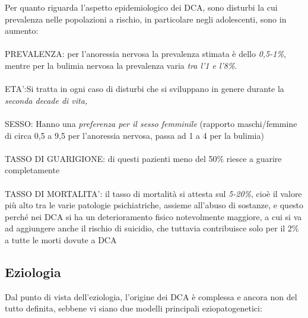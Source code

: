 Per quanto riguarda l'aspetto epidemiologico dei DCA, sono disturbi la
cui prevalenza nelle popolazioni a rischio, in particolare negli
adolescenti, sono in aumento:
\\\\
PREVALENZA: per l'anoressia nervosa la prevalenza stimata è dello
\emph{0,5-1\%}, mentre per la bulimia nervosa la prevalenza varia
\emph{tra l'1 e l'8\%}.
\\\\
ETA':Si tratta in ogni caso di disturbi che si sviluppano in genere
durante la \emph{seconda decade di vita,}
\\\\
SESSO: Hanno una \emph{preferenza per il sesso femminile} (rapporto
maschi/femmine di circa 0,5 a 9,5 per l'anoressia nervosa, passa ad 1 a
4 per la bulimia)
\\\\
TASSO DI GUARIGIONE: di questi pazienti meno del 50\% riesce a guarire
completamente
\\\\
TASSO DI MORTALITA': il tasso di mortalità si attesta sul \emph{5-20\%},
cioè il valore più alto tra le varie patologie psichiatriche, assieme
all'abuso di sostanze, e questo perché nei DCA si ha un deterioramento
fisico notevolmente maggiore, a cui si va ad aggiungere anche il rischio
di suicidio, che tuttavia contribuisce solo per il 2\% a tutte le morti
dovute a DCA

\subsection{Eziologia}

Dal punto di vista dell'eziologia, l'origine dei DCA è complessa e
ancora non del tutto definita, sebbene vi siano due modelli principali
eziopatogenetici:

